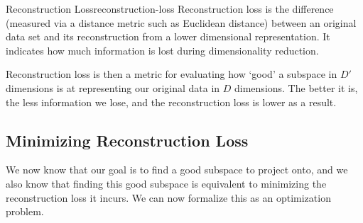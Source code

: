 \begin{definition}{Reconstruction Loss}{reconstruction-loss}
    Reconstruction loss is the difference (measured via a distance metric such as Euclidean distance) between an original data set and its reconstruction from a lower dimensional representation. It indicates how much information is lost during dimensionality reduction.
\end{definition}

Reconstruction loss is then a metric for evaluating how `good' a subspace in $D'$ dimensions is at representing our original data in $D$ dimensions. The better it is, the less information we lose, and the reconstruction loss is lower as a result.

\subsection{Minimizing Reconstruction Loss}
We now know that our goal is to find a good subspace to project onto, and we also know that finding this good subspace is equivalent to minimizing the reconstruction loss it incurs. We can now formalize this as an optimization problem.

